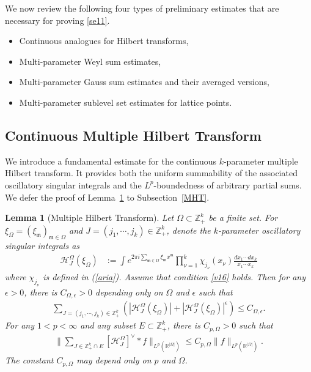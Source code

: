 \documentclass[10pt,a4paper]{amsart}
\newtheorem{lemma}{Lemma}\numberwithin{lemma}{section}
\numberwithin{equation}{section}
\begin{document}
We now  review the following four types of preliminary estimates that are necessary for proving \eqref{se11}.

\begin{itemize}
	\item[3.1.] Continuous analogues for Hilbert transforms,
	
	\item[3.2.] Multi-parameter Weyl sum estimates,
	
	\item[ 3.3.] Multi-parameter Gauss sum estimates and their averaged versions,
	
	\item[3.4.] Multi-parameter sublevel set estimates for lattice points.
\end{itemize}

\subsection{Continuous Multiple Hilbert Transform}
We introduce a fundamental estimate for the continuous $k$-parameter multiple Hilbert transform. It provides both the uniform summability of the associated oscillatory singular integrals and the $L^p$-boundedness of arbitrary partial sums. We defer the proof of Lemma~\ref{po3} to Subsection~\ref{MHT}.

\begin{lemma} [Multiple Hilbert Transform]\label{po3}
	Let $\Omega\subset \mathbb Z_+^k$ be a finite set. For    $\xi_{\Omega}=(\xi_{\mathfrak{m}})_{\mathfrak{m}\in\Omega}$ and  $J=(j_1,\cdots,j_k)\in \mathbb{Z}_+^k$,  denote the $k$-parameter oscillatory singular integrals as 
	\begin{align*} 
		\mathcal{H}^{\Omega}_{J}(\xi_{\Omega})&:= \int e^{2\pi i\sum_{\mathfrak{m}\in\Omega} \xi_{\mathfrak{m}} x^{\mathfrak{m}} }\prod_{\nu=1}^k\chi_{j_\nu}(x_\nu) \frac{dx_1\cdots dx_k }{x_1\cdots x_k}
	\end{align*}
	where $\chi_{j_\nu}$ is defined in (\ref{aria}). Assume that condition \eqref{v16} holds.
	  Then for any $\epsilon>0$, there is $C_{\Omega,\epsilon} >0$ depending  only on $\Omega$ and $\epsilon$ such that
	\begin{align}\label{po4}
		\sum_{J=(j_1,\cdots,j_k)\in \mathbb{Z}_+^k} \left( |\mathcal{H}^{\Omega}_{J}(\xi_{\Omega}) |+ |\mathcal{H}^{\Omega}_{J}(\xi_{\Omega}) |^{\epsilon}\right) \le C_{\Omega,\epsilon}. 
	\end{align}
	For any $1<p<\infty$ and any subset $E\subset\mathbb{Z}_+^k$, there is $C_{p,\Omega}>0$  such that
	\begin{align}\label{poo4}
		\| \sum_{J\in \mathbb{Z}_+^k\cap E}  [\mathcal{H}^{\Omega}_{J}]^{\vee}*f \|_{L^p(\mathbb{R}^{|\Omega|})}\le C_{p,\Omega}\| f \|_{L^p(\mathbb{R}^{|\Omega|})}.
	\end{align}The constant $C_{p,\Omega}$ may depend only on  $p$ and $\Omega$.
	
\end{lemma}
\end{document}
